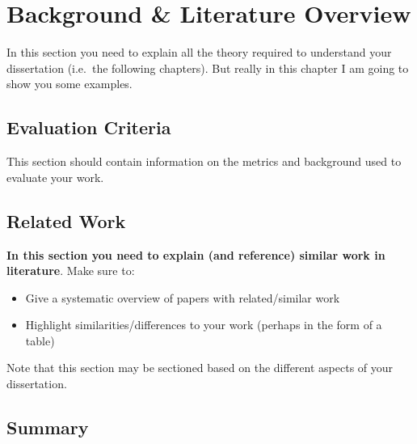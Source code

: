 \chapter{Background \& Literature Overview}

In this section you need to explain all the theory required to understand your dissertation (i.e.\ the following chapters). But really in this chapter I am going to show you some examples.

\section{Evaluation Criteria}
This section should contain information on the metrics and background used to evaluate your work.

\section{Related Work}
\textbf{In this section you need to explain (and reference) similar work in literature}.  Make sure to:

\begin{itemize}
 \item Give a systematic overview of papers with related/similar work
 \item Highlight similarities/differences to your work (perhaps in the form of a table)
\end{itemize}

Note that this section may be sectioned based on the different aspects of your dissertation.

\section{Summary}
\blindtext
